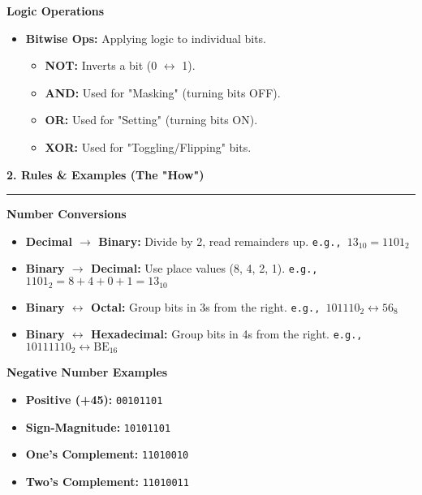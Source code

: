 \documentclass[a4paper, 8pt]{extarticle}
\newcommand{\sectionheading}[1]{\large\textbf{#1}\par\noindent\rule{\linewidth}{0.4pt}}
\newcommand{\subsectionheading}[1]{\normalsize\textbf{#1}}
\begin{document}
\begin{multicols}{2}
\subsectionheading{Logic Operations}
\begin{itemize}
    \item \textbf{Bitwise Ops:} Applying logic to individual bits.
    \begin{itemize}
        \item \textbf{NOT:} Inverts a bit (0 $\leftrightarrow$ 1).
        \item \textbf{AND:} Used for "Masking" (turning bits OFF).
        \item \textbf{OR:} Used for "Setting" (turning bits ON).
        \item \textbf{XOR:} Used for "Toggling/Flipping" bits.
    \end{itemize}
\end{itemize}


\columnbreak %

\sectionheading{2. Rules \& Examples (The "How")}
\vspace{0.5em}

\subsectionheading{Number Conversions}
\begin{itemize}
    \item \textbf{Decimal $\rightarrow$ Binary:} Divide by 2, read remainders up. \newline \texttt{e.g., $13_{10} = 1101_2$}
    \item \textbf{Binary $\rightarrow$ Decimal:} Use place values (8, 4, 2, 1). \newline \texttt{e.g., $1101_2 = 8+4+0+1 = 13_{10}$}
    \item \textbf{Binary $\leftrightarrow$ Octal:} Group bits in 3s from the right. \newline \texttt{e.g., $101110_2 \leftrightarrow 56_8$}
    \item \textbf{Binary $\leftrightarrow$ Hexadecimal:} Group bits in 4s from the right. \newline \texttt{e.g., $10111110_2 \leftrightarrow \text{BE}_{16}$}
\end{itemize}

\subsectionheading{Negative Number Examples}
\begin{tcolorbox}[title=\textbf{Example: -45 in 8-bit}]
\begin{itemize}
    \item \textbf{Positive (+45):} \texttt{00101101}
    \item \textbf{Sign-Magnitude:} \texttt{10101101}
    \item \textbf{One's Complement:} \texttt{11010010}
    \item \textbf{Two's Complement:} \texttt{11010011}
\end{itemize}
\end{tcolorbox}


\end{multicols}
\end{document}
